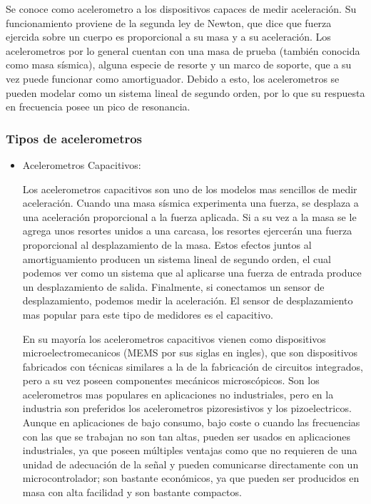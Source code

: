 Se conoce como acelerometro a los dispositivos capaces de medir aceleración. Su
funcionamiento proviene de la segunda ley de Newton, que dice que fuerza
ejercida sobre un cuerpo es proporcional a su masa y a su aceleración. Los
acelerometros por lo general cuentan con una masa de prueba (también conocida
como masa sísmica), alguna especie de resorte y un marco de soporte, que a su
vez puede funcionar como amortiguador. Debido a esto, los acelerometros se
pueden modelar como un sistema lineal de segundo orden, por lo que su respuesta
en frecuencia posee un pico de resonancia.

\subsubsection*{Tipos de acelerometros}

\begin{itemize}
    \item  Acelerometros Capacitivos:

Los acelerometros capacitivos son uno de los modelos mas sencillos de medir
aceleración. Cuando una masa sísmica experimenta una fuerza, se desplaza a una
aceleración proporcional a la fuerza aplicada. Si a su vez a la masa se le
agrega unos resortes unidos a una carcasa, los resortes ejercerán una fuerza
proporcional al desplazamiento de la masa. Estos efectos juntos al
amortiguamiento producen un sistema lineal de segundo orden, el cual podemos
ver como un sistema que al aplicarse una fuerza de entrada produce un
desplazamiento de salida. Finalmente, si conectamos un sensor de
desplazamiento, podemos medir la aceleración. El sensor de desplazamiento mas
popular para este tipo de medidores es el capacitivo.

En su mayoría los acelerometros capacitivos vienen como dispositivos
microelectromecanicos (MEMS por sus siglas en ingles), que son dispositivos
fabricados con técnicas similares a la de la fabricación de circuitos
integrados, pero a su vez poseen componentes mecánicos microscópicos. Son los
acelerometros mas populares en aplicaciones no industriales, pero en la
industria son preferidos los acelerometros pizoresistivos y los pizoelectricos.
Aunque en aplicaciones de bajo consumo, bajo coste o cuando las frecuencias con
las que se trabajan no son tan altas, pueden ser usados en aplicaciones
industriales, ya que poseen múltiples ventajas como que no requieren de una
unidad de adecuación de la señal y pueden comunicarse directamente con un
microcontrolador; son bastante económicos, ya que pueden ser producidos en
masa con alta facilidad y son bastante compactos.


\end{itemize}
